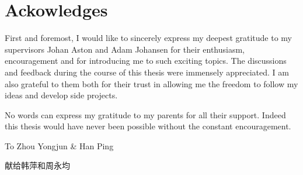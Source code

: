 \chapter*{Ackowledges}

First and foremost, I would like to sincerely express my deepest gratitude to
my supervisors Johan Aston and Adam Johansen for their enthusiasm,
encouragement and for introducing me to such exciting topics. The discussions
and feedback during the course of this thesis were immensely appreciated. I am
also grateful to them both for their trust in allowing me the freedom to
follow my ideas and develop side projects.

No words can express my gratitude to my parents for all their support. Indeed
this thesis would have never been possible without the constant encouragement.

\baselineskip
\begin{center}
  \Large To Zhou Yongjun \& Han Ping
\end{center}
\begin{center}
  \Large 献给韩萍和周永均
\end{center}
